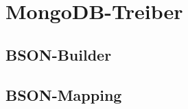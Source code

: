 \section{MongoDB-Treiber}
\label{sec:b-mongodb-treiber}

\subsection{BSON-Builder}
\label{sec:bm-bson-builder}

\subsection{BSON-Mapping}
\label{sec:bm-bson-mapping}
